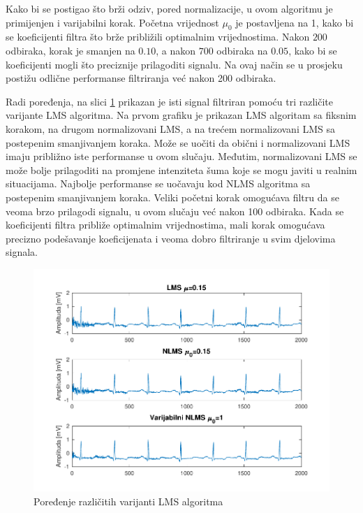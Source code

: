 \documentclass[12pt]{SeminarskiADS}
\begin{document}
Kako bi se postigao što brži odziv, pored normalizacije, u ovom algoritmu je primijenjen i varijabilni korak. Početna vrijednost $\mu_{0}$ je postavljena na 1, kako bi se koeficijenti filtra što brže približili optimalnim vrijednostima. Nakon $200$ odbiraka, korak je smanjen na $0.10$, a nakon $700$ odbiraka na $0.05$, kako bi se koeficijenti mogli što preciznije prilagoditi signalu. Na ovaj način se u prosjeku postižu odlične performanse filtriranja već nakon 200 odbiraka.

Radi poređenja, na slici \ref{lmsgrafik_por} prikazan je isti signal filtriran pomoću tri različite varijante LMS algoritma. Na prvom grafiku je prikazan LMS algoritam sa fiksnim korakom, na drugom normalizovani LMS, a na trećem normalizovani LMS sa postepenim smanjivanjem koraka. Može se uočiti da obični i normalizovani LMS imaju približno iste performanse u ovom slučaju. Međutim, normalizovani LMS se može bolje prilagoditi na promjene intenziteta šuma koje se mogu javiti u realnim situacijama. Najbolje performanse se uočavaju kod NLMS algoritma sa postepenim smanjivanjem koraka. Veliki početni korak omogućava filtru da se veoma brzo prilagodi signalu, u ovom slučaju već nakon 100 odbiraka. Kada se koeficijenti filtra približe optimalnim vrijednostima, mali korak omogućava precizno podešavanje koeficijenata i veoma dobro filtriranje u svim djelovima signala. 

\begin{figure}[h]
\centering
\includegraphics[width=\textwidth]{lmsgrafik_por}
\caption{Poređenje različitih varijanti LMS algoritma}
\label{lmsgrafik_por}
\end{figure}
\end{document}

